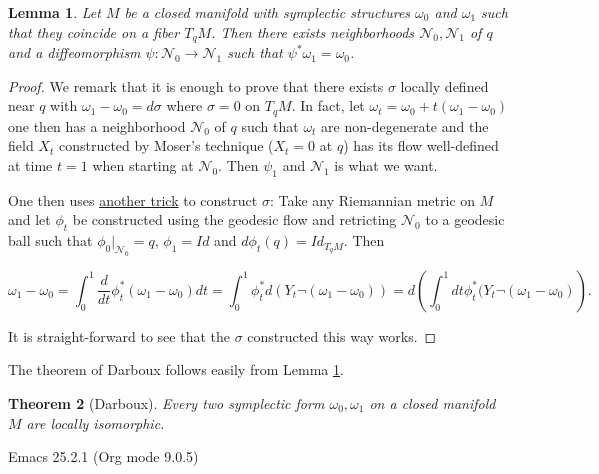 \documentclass[11pt]{article}
\newtheorem{theorem}{Theorem}
\newtheorem{lemma}[theorem]{Lemma}
\begin{document}
\begin{lemma}
\label{lem1}
Let \(M\) be a closed manifold with symplectic structures \(\omega_0\) and \(\omega_1\) such
that they coincide on a fiber \(T_qM\). Then there exists neighborhoods \(\mathcal{N}_0,
\mathcal{N}_1\) of \(q\) and a diffeomorphism \(\psi: \mathcal{N}_0 \longrightarrow
\mathcal{N}_1\) such that \(\psi^* \omega_1 = \omega_0\). 
\end{lemma}


\begin{proof}
We remark that it is enough to prove that there exists \(\sigma\) locally defined near \(q\)
with \(\omega_1 -\omega_0 = d\sigma\) where \(\sigma = 0\) on \(T_qM\). In fact, let \(\omega_t =
\omega_0 + t(\omega_1 - \omega_0)\) one then has a neighborhood \(\mathcal{N}_0\) of \(q\)
such that \(\omega_t\) are non-degenerate and the field \(X_t\) constructed by Moser's
technique (\(X_t=0\) at \(q\)) has its flow well-defined at time \(t=1\) when starting at \(\mathcal{N}_0\). Then \(\psi_1\) and \(\mathcal{N}_1\) is what we want.

One then uses \uline{another trick} to construct \(\sigma\): Take any Riemannian metric on \(M\) and
let \(\phi_t\) be constructed using the geodesic flow and retricting \(\mathcal{N}_0\) to a
geodesic ball such that \(\phi_0|_{\mathcal{N}_0} = q\), \(\phi_1 = Id\) and \(d\phi_t (q) =
Id_{T_qM}\). Then

\[
\omega_1 - \omega_0 = \int_0^1 \frac{d}{dt}\phi^*_t(\omega_1 - \omega_0) dt = \int_0^1
\phi_t^* d(Y_t \neg(\omega_1 - \omega_0) )= d \left( \int_0^1 dt \phi_t^*(Y_t \neg
(\omega_1 - \omega_0) \right).
\]

It is straight-forward to see that the \(\sigma\) constructed this way works.
\end{proof}

The theorem of Darboux follows easily from Lemma \ref{lem1}.

\begin{theorem}[Darboux]
Every two symplectic form \(\omega_0, \omega_1\) on a closed manifold \(M\) are locally isomorphic.
\end{theorem}
Emacs 25.2.1 (Org mode 9.0.5)
\end{document}
